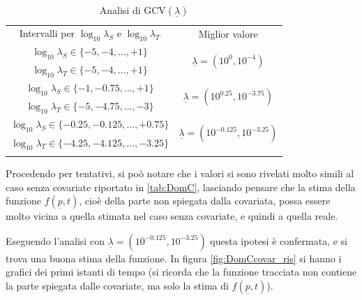 \documentclass[a4paper,11pt,twoside,openright]{book}							%
\begin{document}
\begin{table}[htbp]
\renewcommand{\arraystretch}{1.3}
\setlength{\tabcolsep}{2mm}
\centering
	\begin{tabular}{!{\vrule width 1.2pt}c!{\vrule width 1.2pt}c!{\vrule width 1.2pt}}
	Intervalli per $\log_{10}\lambda_S$ e $\log_{10}\lambda_T$& Miglior valore											\\
	$\log_{10}\lambda_S \in \{-5,-4,\ldots,+1\}$ 	&  			\\
	$\log_{10}\lambda_T \in \{-5,-4,\ldots,+1\}$		& 															\\	
	$\log_{10}\lambda_S \in \{-1,-0.75,\ldots,+1\}$ 	&  		\\
	$\log_{10}\lambda_T \in \{-5,-4.75,\ldots,-3\}$	& 															\\	
	$\log_{10}\lambda_S \in \{-0.25,-0.125,\ldots,+0.75\}$ 	& 	\\
	$\log_{10}\lambda_T \in \{-4.25,-4.125,\ldots,-3.25\}$		& 												\\	
	\end{tabular}
\caption{Analisi di $\mathrm{GCV}(\underline \lambda)$}
\label{tab:DomC_covar}
\end{table}

Procedendo per tentativi, si poò notare che i valori si sono rivelati molto simili al caso senza covariate riportato in \ref{tab:DomC}, lasciando pensare che la stima della funzione $f(\underline p,t)$, cioè della parte non spiegata dalla covariata, possa essere molto vicina a quella stimata nel caso senza covariate, e quindi a quella reale.

Eseguendo l'analisi con $\underline \lambda = (10^{-0.125}, 10^{-3.25})$ questa ipotesi è confermata, e si trova una buona stima della funzione. In figura \ref{fig:DomCcovar_ris} si hanno i grafici dei primi istanti di tempo (si ricorda che la funzione tracciata non contiene la parte spiegata dalle covariate, ma solo la stima di $f(\underline p,t)$). 

\newpage
\end{document}
